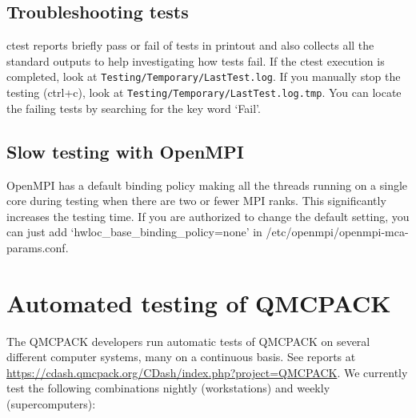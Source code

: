 \subsection{Troubleshooting tests}
ctest reports briefly pass or fail of tests in printout and also collects all the standard outputs to help investigating how tests fail.
If the ctest execution is completed, look at \texttt{Testing/Temporary/LastTest.log}.
If you manually stop the testing (ctrl+c), look at \texttt{Testing/Temporary/LastTest.log.tmp}.
You can locate the failing tests by searching for the key word `Fail'.

\subsection{Slow testing with OpenMPI}
OpenMPI has a default binding policy making all the threads running on a single core during testing when there are two or fewer MPI ranks.
This significantly increases the testing time. If you are authorized to change the default setting, you can just add `hwloc\_base\_binding\_policy=none' in /etc/openmpi/openmpi-mca-params.conf.

\section{Automated testing of QMCPACK}

The QMCPACK developers run automatic tests of QMCPACK on several
different computer systems,  many on a continuous basis. See reports at
\url{https://cdash.qmcpack.org/CDash/index.php?project=QMCPACK}.
We currently test
the following combinations nightly (workstations) and weekly (supercomputers):

